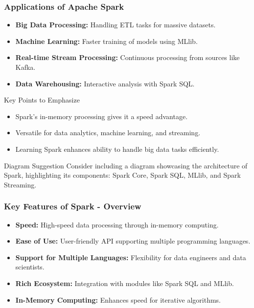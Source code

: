 \documentclass[aspectratio=169]{beamer}
\begin{document}
\begin{frame}[fragile]
    \frametitle{Applications of Apache Spark}
    \begin{itemize}
        \item \textbf{Big Data Processing:} Handling ETL tasks for massive datasets.
        \item \textbf{Machine Learning:} Faster training of models using MLlib.
        \item \textbf{Real-time Stream Processing:} Continuous processing from sources like Kafka.
        \item \textbf{Data Warehousing:} Interactive analysis with Spark SQL.
    \end{itemize}
    
    \begin{block}{Key Points to Emphasize}
        \begin{itemize}
            \item Spark’s in-memory processing gives it a speed advantage.
            \item Versatile for data analytics, machine learning, and streaming.
            \item Learning Spark enhances ability to handle big data tasks efficiently.
        \end{itemize}
    \end{block}
    
    \begin{block}{Diagram Suggestion}
        Consider including a diagram showcasing the architecture of Spark, highlighting its components: Spark Core, Spark SQL, MLlib, and Spark Streaming.
    \end{block}
\end{frame}

\begin{frame}[fragile]
    \frametitle{Key Features of Spark - Overview}
    \begin{itemize}
      \item \textbf{Speed:} High-speed data processing through in-memory computing.
      \item \textbf{Ease of Use:} User-friendly API supporting multiple programming languages.
      \item \textbf{Support for Multiple Languages:} Flexibility for data engineers and data scientists.
      \item \textbf{Rich Ecosystem:} Integration with modules like Spark SQL and MLlib.
      \item \textbf{In-Memory Computing:} Enhances speed for iterative algorithms.
    \end{itemize}
\end{frame}
\end{document}
